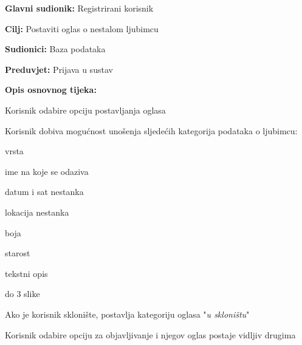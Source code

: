 					\noindent {}
					\begin{packed_item}
	
						\item \textbf{Glavni sudionik:} Registrirani korisnik
						\item  \textbf{Cilj:} Postaviti oglas o nestalom ljubimcu
						\item  \textbf{Sudionici:} Baza podataka
						\item  \textbf{Preduvjet:} Prijava u sustav
						\item  \textbf{Opis osnovnog tijeka:}
						
						\item[] \begin{packed_enum}
	
							\item Korisnik odabire opciju postavljanja oglasa
							\item Korisnik dobiva mogućnost unošenja sljedećih kategorija podataka o ljubimcu:
								
								\item[] \begin {packed_enum}
									\item vrsta
									\item ime na koje se odaziva
									\item datum i sat nestanka
									\item lokacija nestanka
									\item boja
									\item starost
									\item tekstni opis
									\item do 3 slike
								\end{packed_enum}
							
							\item Ako je korisnik sklonište, postavlja kategoriju oglasa "\textit{u skloništu}"
							\item Korisnik odabire opciju za objavljivanje i njegov oglas postaje vidljiv drugima
						\end{packed_enum}
					\end{packed_item}
					
